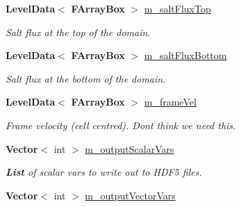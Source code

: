 \begin{DoxyCompactItemize}
\mbox{\label{class_a_m_r_level_mushy_layer_a89f01be36bc140aaac63f16a74aa6e9a}} 
\textbf{ Level\+Data}$<$ \textbf{ F\+Array\+Box} $>$ \hyperlink{class_a_m_r_level_mushy_layer_a89f01be36bc140aaac63f16a74aa6e9a}{m\+\_\+salt\+Flux\+Top}
\begin{DoxyCompactList}\small\item\em Salt flux at the top of the domain. \end{DoxyCompactList}\item 
\mbox{\label{class_a_m_r_level_mushy_layer_a3019ebcb233c3bdb4f1646e1f1022221}} 
\textbf{ Level\+Data}$<$ \textbf{ F\+Array\+Box} $>$ \hyperlink{class_a_m_r_level_mushy_layer_a3019ebcb233c3bdb4f1646e1f1022221}{m\+\_\+salt\+Flux\+Bottom}
\begin{DoxyCompactList}\small\item\em Salt flux at the bottom of the domain. \end{DoxyCompactList}\item 
\mbox{\label{class_a_m_r_level_mushy_layer_a519fbccec0b9fa2dff32d9040c7d579d}} 
\textbf{ Level\+Data}$<$ \textbf{ F\+Array\+Box} $>$ \hyperlink{class_a_m_r_level_mushy_layer_a519fbccec0b9fa2dff32d9040c7d579d}{m\+\_\+frame\+Vel}
\begin{DoxyCompactList}\small\item\em Frame velocity (cell centred). Don\textquotesingle{}t think we need this. \end{DoxyCompactList}\item 
\mbox{\label{class_a_m_r_level_mushy_layer_a3556903e5a8df44f5e8ad9113bb782a0}} 
\textbf{ Vector}$<$ int $>$ \hyperlink{class_a_m_r_level_mushy_layer_a3556903e5a8df44f5e8ad9113bb782a0}{m\+\_\+output\+Scalar\+Vars}
\begin{DoxyCompactList}\small\item\em \textbf{ List} of scalar vars to write out to H\+D\+F5 files. \end{DoxyCompactList}\item 
\mbox{\label{class_a_m_r_level_mushy_layer_a26eb81fbe2e9bcaf1d72099d4a15cc45}} 
\textbf{ Vector}$<$ int $>$ \hyperlink{class_a_m_r_level_mushy_layer_a26eb81fbe2e9bcaf1d72099d4a15cc45}{m\+\_\+output\+Vector\+Vars}

\end{DoxyCompactItemize}

